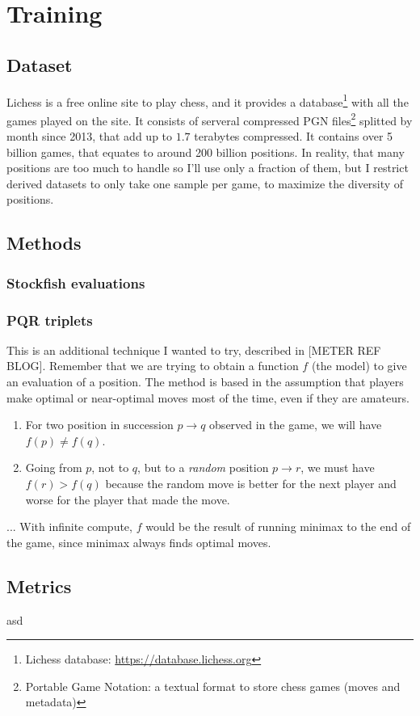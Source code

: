 
\section{Training}

\subsection{Dataset}

Lichess is a free online site to play chess, and it provides a database\footnote[1]{Lichess database: \url{https://database.lichess.org}} with all the games played on the site. It consists of serveral compressed PGN files\footnote[2]{Portable Game Notation: a textual format to store chess games (moves and metadata)} splitted by month since 2013, that add up to $1.7$ terabytes compressed. It contains over 5 billion games, that equates to around 200 billion positions. In reality, that many positions are too much to handle so I'll use only a fraction of them, but I restrict derived datasets to only take one sample per game, to maximize the diversity of positions.


\subsection{Methods}



\subsubsection{Stockfish evaluations}


\subsubsection{PQR triplets}

This is an additional technique I wanted to try, described in [METER REF BLOG]. Remember that we are trying to obtain a function $f$ (the model) to give an evaluation of a position. The method is based in the assumption that players make optimal or near-optimal moves most of the time, even if they are amateurs.

\begin{enumerate}
\item For two position in succession $p \rightarrow q$  observed in the game, we will have $f(p) \neq f(q)$.
\item Going from $p$, not to $q$, but to a \textit{random} position $p \rightarrow r$, we must have $f(r) > f(q)$ because the random move is better for the next player and worse for the player that made the move.
\end{enumerate}


... With infinite compute, $f$ would be the result of running minimax to the end of the game, since minimax always finds optimal moves.

\subsection{Metrics}

asd \cite{knuth:1984}
